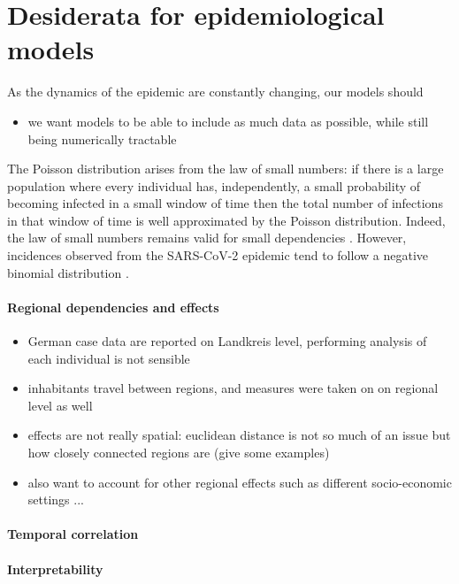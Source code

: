 \section{Desiderata for epidemiological models}
\label{sec:dessiderata}

As the dynamics of the epidemic are constantly changing, our models should



\begin{itemize}
    \item we want models to be able to include as much data as possible, while still being numerically tractable 
\end{itemize}

The Poisson distribution arises from the law of small numbers: if there is a large population where every individual has, independently, a small probability of becoming infected in a small window of time then the total number of infections in that window of time is well approximated by the Poisson distribution.
Indeed, the law of small numbers remains valid for small dependencies \cite{Ross2011Fundamentalsa,Arratia1990Poisson}.
However, incidences observed from the SARS-CoV-2 epidemic tend to follow a negative binomial distribution \cite{Chan2021Count}. 

\paragraph{Regional dependencies and effects}
\begin{itemize}
    \item German case data are reported on Landkreis level, performing analysis of each individual is not sensible 
    \item inhabitants travel between regions, and measures were taken on on regional level as well
    \item effects are not really spatial: euclidean distance is not so much of an issue but how closely connected regions are (give some examples)
    \item also want to account for other regional effects such as different socio-economic settings ... 
\end{itemize}

\paragraph{Temporal correlation}

\paragraph{Interpretability}


